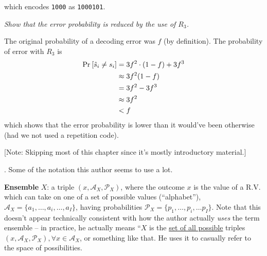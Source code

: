 \documentclass[11pt]{article}
\begin{document}
\begin{compactitem}
	which encodes \texttt{1000} as \texttt{1000101}.
\end{compactitem}

\myspace
{}
\myspace

\begin{example}
	\textit{Show that the error probability is reduced by the use of $R_3$.}
	
	\tcblower 
	
	\green{[correct]} The original probability of a decoding error was $f$ (by definition). The probability of error with $R_3$ is
	\begin{align}
		\text{Pr}_{}\left[\hat{s}_i \ne s_i\right]
			&= 3 f^2 \cdot (1 - f) + 3 f^3 \\
			&\approx 3 f^2 (1 - f) \\
			&= 3 f^2 - 3 f^3 \\
			&\approx 3 f^2 \\
			&< f
	\end{align}
	which shows that the error probability is lower than it would've been otherwise (had we not used a repetition code).
\end{example}



{\footnotesize [Note: Skipping most of this chapter since it's mostly introductory material.]}

\myspace
\p {}. Some of the notation this author seems to use a lot.
\begin{compactitem}
	\item \textbf{Ensemble} $X$: a triple $(x, \mathcal{A}_X, \mathcal{P}_X)$, where the outcome $x$ is the value of a R.V. which can take on one of a set of possible values (``alphabet''), $\mathcal{A}_X = \{a_1, \ldots, a_i, \ldots, a_I\}$, having probabilities $\mathcal{P}_X = \{p_1, \ldots, p_i, \ldots p_I\}$. Note that this doesn't appear technically consistent with how the author actually \textit{uses} the term ensemble -- in practice, he actually means ``$X$ is the \underline{set of all possible} triples $(x, \mathcal{A}_X, \mathcal{P}_X), \forall x \in \mathcal{A}_X$, or something like that. He uses it to casually refer to the space of possibilities.
\end{compactitem}
\end{document}
